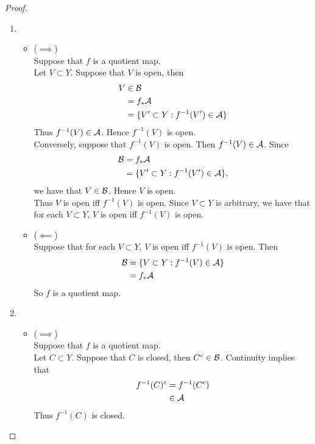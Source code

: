 \documentclass{book}
\begin{document}
	\begin{proof}\
		\begin{enumerate}
			\item 
			\begin{itemize}
				\item ($\implies$) \\
				Suppose that $f$ is a quotient map.\\
				Let $V \subset Y$. Suppose that $V$ is open, then 
				\begin{align*}
					V 
					& \in \mathcal{B} \\
					& = f_*\mathcal{A} \\
					& = \{V' \subset Y: f^{-1}(V') \in \mathcal{A} \}
				\end{align*} 
				Thus $f^{-1}(V) \in \mathcal{A}$. Hence $f^{-1}(V)$ is open. \\
				Conversely, suppose that $f^{-1}(V)$ is open. Then $f^{-1}(V) \in \mathcal{A}$. Since
				\begin{align*}
					\mathcal{B} 
					& = f_*\mathcal{A} \\
					& = \{V' \subset Y: f^{-1}(V') \in \mathcal{A} \},
				\end{align*}
				we have that $V \in \mathcal{B}$. Hence $V$ is open. \\ 
				Thus $V$ is open iff $f^{-1}(V)$ is open. Since $V \subset Y$ is arbitrary, we have that for each $V \subset Y$, $V$ is open iff $f^{-1}(V)$ is open.
				\item ($\impliedby$) \\
				Suppose that for each $V \subset Y$, $V$ is open iff $f^{-1}(V)$ is open. Then 
				\begin{align*}
					\mathcal{B}
					& = \{V \subset Y: f^{-1}(V) \in \mathcal{A} \} \\
					& = f_* \mathcal{A}
				\end{align*}
				So $f$ is a quotient map.
			\end{itemize}
			\item 
			\begin{itemize}
				\item ($\implies$) \\
				Suppose that $f$ is a quotient map.\\
				Let $C \subset Y$. Suppose that $C$ is closed, then $C^c \in \mathcal{B}$. Continuity implies that
				\begin{align*}
					f^{-1}(C)^c 
					& = f^{-1}(C^c) \\
					& \in \mathcal{A} 
				\end{align*}
				Thus $f^{-1}(C)$ is closed. \\

\end{itemize}
\end{enumerate}
\end{proof}
\end{document}
